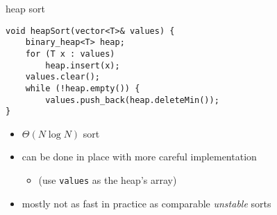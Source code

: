 \begin{frame}[fragile,label=heapSort]{heap sort}
\lstset{language=C++,style=smaller}
\begin{lstlisting}
void heapSort(vector<T>& values) {
    binary_heap<T> heap; 
    for (T x : values)
        heap.insert(x);
    values.clear();
    while (!heap.empty()) {
        values.push_back(heap.deleteMin());
}
\end{lstlisting}
\begin{itemize}
\item $\Theta(N \log N)$ sort 
\item can be done in place with more careful implementation
    \begin{itemize}
    \item (use \texttt{values} as the heap's array)
    \end{itemize}
\item mostly not as fast in practice as comparable \textit{unstable} sorts
\end{itemize}
\end{frame}
